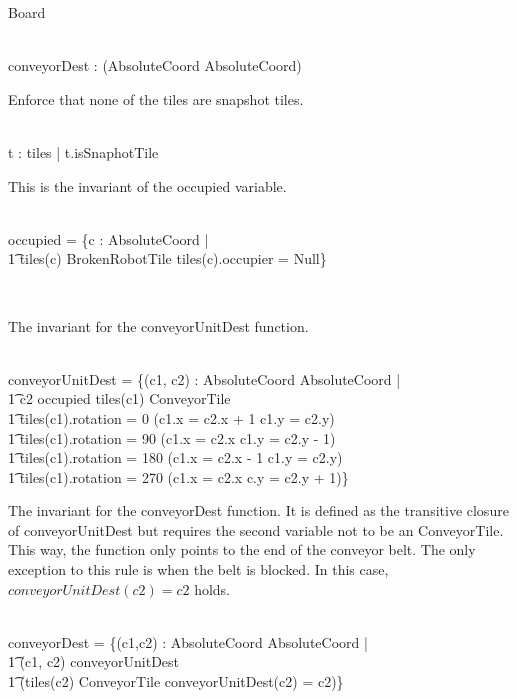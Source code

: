 \documentclass[12pt]{article}
\begin{document}
\begin{class}{Board}
\begin{nobottomstate}
\begin{zpar}
\end{zpar} \\
conveyorDest : \power (AbsoluteCoord \pinj AbsoluteCoord)
\where
\begin{zpar}
Enforce that none of the tiles are snapshot tiles.
\end{zpar} \\
\forall t : \ran tiles | \neg t.isSnaphotTile
\also \also \also
\begin{zpar}
This is the invariant of the occupied variable.
\end{zpar} \\
occupied = \{c : AbsoluteCoord | \\ \t1 tiles(c) \in BrokenRobotTile \vee
tiles(c).occupier \not = Null\} \\
\end{nobottomstate} \\
\znewpage
\begin{notopstate}
\begin{zpar}
The invariant for the conveyorUnitDest function.
\end{zpar} \\
conveyorUnitDest = \{(c1, c2) : AbsoluteCoord \times AbsoluteCoord | \\ \t1 c2 \not \in occupied \wedge tiles(c1) \in ConveyorTile \; \; \wedge \\ \t1
        tiles(c1).rotation = 0 \Rightarrow (c1.x = c2.x + 1 \wedge c1.y = c2.y) \; \; \wedge \\ \t1
        tiles(c1).rotation = 90 \Rightarrow (c1.x = c2.x \wedge c1.y = c2.y - 1) \; \; \wedge \\ \t1
        tiles(c1).rotation = 180 \Rightarrow (c1.x = c2.x - 1 \wedge c1.y = c2.y) \; \; \wedge \\ \t1
        tiles(c1).rotation = 270 \Rightarrow (c1.x = c2.x \wedge c.y = c2.y + 1)\}
\also \also \also
\begin{zpar}
The invariant for the conveyorDest function. It is defined as the transitive closure of conveyorUnitDest but requires the second variable not to be
an ConveyorTile. This way, the function only points to the end of the conveyor belt.
The only exception to this rule is when the belt is blocked. In this case, $conveyorUnitDest(c2) = c2$ holds.
\end{zpar} \\
conveyorDest = \{(c1,c2) : AbsoluteCoord \times AbsoluteCoord | \\ \t1 (c1, c2) \in conveyorUnitDest \star \; \; \wedge \\ \t1 (tiles(c2) \not \in ConveyorTile \vee conveyorUnitDest(c2) = c2)\}

\end{notopstate}
\end{class}
\end{document}
